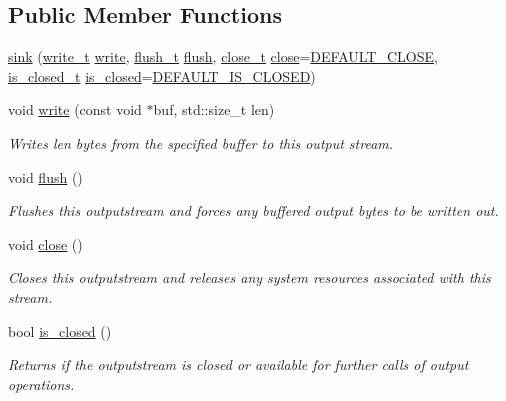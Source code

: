 \subsection*{Public Member Functions}
\begin{DoxyCompactItemize}
\item 
\hyperlink{structdevfix_1_1base_1_1io_1_1sink_a5e065482904521fde4ac8d0e378529c8}{sink} (\hyperlink{namespacedevfix_1_1base_1_1io_a75953e4d7f81d76e419f9672ffedda87}{write\+\_\+t} \hyperlink{structdevfix_1_1base_1_1io_1_1sink_a6eade9933d316139e952b7a442f3c56d}{write}, \hyperlink{namespacedevfix_1_1base_1_1io_a622685976c7f503411827fba028d3ce1}{flush\+\_\+t} \hyperlink{structdevfix_1_1base_1_1io_1_1sink_abf208747c9be8295972fbc4696ddc557}{flush}, \hyperlink{namespacedevfix_1_1base_1_1io_ae3118387742e5f4d484a328a213d6a5d}{close\+\_\+t} \hyperlink{structdevfix_1_1base_1_1io_1_1sink_a2d110d27baa88f462540e7fd59fb8b3c}{close}=\hyperlink{namespacedevfix_1_1base_1_1io_a14a286c17d4b93881d42b1d14beb2d0b}{D\+E\+F\+A\+U\+L\+T\+\_\+\+C\+L\+O\+SE}, \hyperlink{namespacedevfix_1_1base_1_1io_a14f89d4437ced6ede49c044ee8e71f17}{is\+\_\+closed\+\_\+t} \hyperlink{structdevfix_1_1base_1_1io_1_1sink_a1e5782219f9256d8ff09385fa6f3b156}{is\+\_\+closed}=\hyperlink{namespacedevfix_1_1base_1_1io_ae04fec2a2a2db3482e624a59e59a2a14}{D\+E\+F\+A\+U\+L\+T\+\_\+\+I\+S\+\_\+\+C\+L\+O\+S\+ED})
\item 
void \hyperlink{structdevfix_1_1base_1_1io_1_1sink_a6eade9933d316139e952b7a442f3c56d}{write} (const void $\ast$buf, std\+::size\+\_\+t len)
\begin{DoxyCompactList}\small\item\em Writes len bytes from the specified buffer to this output stream. \end{DoxyCompactList}\item 
void \hyperlink{structdevfix_1_1base_1_1io_1_1sink_abf208747c9be8295972fbc4696ddc557}{flush} ()
\begin{DoxyCompactList}\small\item\em Flushes this {\itshape outputstream} and forces any buffered output bytes to be written out. \end{DoxyCompactList}\item 
void \hyperlink{structdevfix_1_1base_1_1io_1_1sink_a2d110d27baa88f462540e7fd59fb8b3c}{close} ()
\begin{DoxyCompactList}\small\item\em Closes this {\itshape outputstream} and releases any system resources associated with this stream. \end{DoxyCompactList}\item 
bool \hyperlink{structdevfix_1_1base_1_1io_1_1sink_a1e5782219f9256d8ff09385fa6f3b156}{is\+\_\+closed} ()
\begin{DoxyCompactList}\small\item\em Returns if the {\itshape outputstream} is closed or available for further calls of output operations. \end{DoxyCompactList}\end{DoxyCompactItemize}


